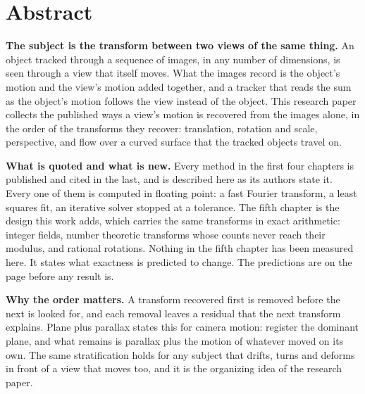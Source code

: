 \chapter*{Abstract}

\textbf{The subject is the transform between two views of the same thing.} An object tracked through
a sequence of images, in any number of dimensions, is seen through a view that itself moves. What
the images record is the object's motion and the view's motion added together, and a tracker that
reads the sum as the object's motion follows the view instead of the object. This research paper collects the
published ways a view's motion is recovered from the images alone, in the order of the transforms
they recover: translation, rotation and scale, perspective, and flow over a curved surface that the
tracked objects travel on.

\textbf{What is quoted and what is new.} Every method in the first four chapters is published and
cited in the last, and is described here as its authors state it. Every one of them is computed in
floating point: a fast Fourier transform, a least squares fit, an iterative solver stopped at a
tolerance. The fifth chapter is the design this work adds, which carries the same transforms in
exact arithmetic: integer fields, number theoretic transforms whose counts never reach their
modulus, and rational rotations. Nothing in the fifth chapter has been measured here. It states what
exactness is predicted to change. The predictions are on the page before any result is.

\textbf{Why the order matters.} A transform recovered first is removed before the next is looked
for, and each removal leaves a residual that the next transform explains. Plane plus parallax states
this for camera motion: register the dominant plane, and what remains is parallax plus the motion of
whatever moved on its own. The same stratification holds for any subject that drifts, turns and
deforms in front of a view that moves too, and it is the organizing idea of the research paper.
